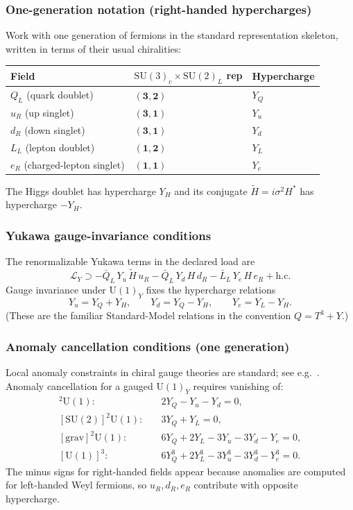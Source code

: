 \documentclass[11pt]{article}
\theoremstyle{remark}
\newcommand{\SU}{\ensuremath{\mathrm{SU}}}
\newcommand{\U}{\ensuremath{\mathrm{U}}}
\begin{document}
\subsubsection{One-generation notation (right-handed hypercharges)}
Work with one generation of fermions in the standard representation skeleton, written in terms of
their usual chiralities:
\begin{center}
\begin{tabular}{@{}lll@{}}
\toprule
Field & $\SU(3)_c\times \SU(2)_L$ rep & Hypercharge \\ \midrule
$Q_L$ (quark doublet) & $(\mathbf{3},\mathbf{2})$ & $Y_Q$ \\
$u_R$ (up singlet) & $(\mathbf{3},\mathbf{1})$ & $Y_u$ \\
$d_R$ (down singlet) & $(\mathbf{3},\mathbf{1})$ & $Y_d$ \\
$L_L$ (lepton doublet) & $(\mathbf{1},\mathbf{2})$ & $Y_L$ \\
$e_R$ (charged-lepton singlet) & $(\mathbf{1},\mathbf{1})$ & $Y_e$ \\
\bottomrule
\end{tabular}
\end{center}
The Higgs doublet has hypercharge $Y_H$ and its conjugate $\tilde H=i\sigma^2 H^\ast$ has hypercharge
$-Y_H$.

\subsubsection{Yukawa gauge-invariance conditions}
The renormalizable Yukawa terms in the declared load are
\begin{equation}\label{eq:yukawas}
\mathcal{L}_Y\supset
-\bar Q_L\,Y_u\,\tilde H\,u_R
-\bar Q_L\,Y_d\,H\,d_R
-\bar L_L\,Y_e\,H\,e_R
+\mathrm{h.c.}
\end{equation}
Gauge invariance under $\U(1)_Y$ fixes the hypercharge relations
\begin{equation}\label{eq:yuk-rel}
Y_u = Y_Q + Y_H,\qquad
Y_d = Y_Q - Y_H,\qquad
Y_e = Y_L - Y_H.
\end{equation}
(These are the familiar Standard-Model relations in the convention $Q=T^3+Y$.)

\subsubsection{Anomaly cancellation conditions (one generation)}
Local anomaly constraints in chiral gauge theories are standard; see e.g.\ \cite{Bertlmann1996,WeinbergQTF2}.
Anomaly cancellation for a gauged $\U(1)_Y$ requires vanishing of:
\begin{align}
[\SU(3)]^2\U(1):\quad & 2Y_Q - Y_u - Y_d =0, \label{eq:A3}\\
[\SU(2)]^2\U(1):\quad & 3Y_Q + Y_L=0, \label{eq:A2}\\
[\text{grav}]^2\U(1):\quad & 6Y_Q + 2Y_L - 3Y_u - 3Y_d - Y_e =0, \label{eq:Agrav}\\
[\U(1)]^3:\quad & 6Y_Q^3+2Y_L^3-3Y_u^3-3Y_d^3-Y_e^3=0. \label{eq:A1}
\end{align}
The minus signs for right-handed fields appear because anomalies are computed for left-handed Weyl
fermions, so $u_R,d_R,e_R$ contribute with opposite hypercharge.
\end{document}
